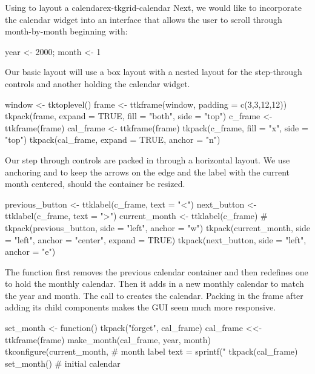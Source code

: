 \begin{example}{Using  to layout a calendar}{ex-tkgrid-calendar}
Next, we would like to incorporate the calendar widget into an interface
that allows the user to scroll through month-by-month beginning with:
\begin{Schunk}
\begin{Sinput}
 year <- 2000; month <- 1
\end{Sinput}
\end{Schunk}

Our basic layout will use a box layout with a nested layout
for the step-through controls and another holding the calendar widget.
\begin{Schunk}
\begin{Sinput}
 window <- tktoplevel()
 frame <- ttkframe(window, padding = c(3,3,12,12))
 tkpack(frame, expand = TRUE, fill = "both", side = "top")
 c_frame <- ttkframe(frame)
 cal_frame <- ttkframe(frame)
 tkpack(c_frame, fill = "x", side = "top")
 tkpack(cal_frame, expand = TRUE, anchor = "n")
\end{Sinput}
\end{Schunk}

Our step through controls are packed in through a horizontal
layout. We use anchoring and  to keep the arrows on the edge and the
label with the current month centered, should the container be resized.
\begin{Schunk}
\begin{Sinput}
 previous_button <- ttklabel(c_frame, text = "<")
 next_button <- ttklabel(c_frame, text = ">")
 current_month <- ttklabel(c_frame)
 #
 tkpack(previous_button, side = "left", anchor = "w")
 tkpack(current_month, side = "left", anchor = "center", expand = TRUE)
 tkpack(next_button, side = "left", anchor = "e")
\end{Sinput}
\end{Schunk}

The  function first removes the previous calendar
container and then
redefines one to hold the monthly calendar. Then it adds in a new
monthly calendar to match the year and month. The call to
 creates the calendar. Packing in the frame after
adding its child components makes the GUI seem much more responsive.
\begin{Schunk}
\begin{Sinput}
 set_month <- function() {
   tkpack("forget", cal_frame)
   cal_frame <<- ttkframe(frame)
   make_month(cal_frame, year, month)
   tkconfigure(current_month,              # month label
               text = sprintf("%
   tkpack(cal_frame)
 }
 set_month()                              # initial calendar
\end{Sinput}
\end{Schunk}


\end{example}
